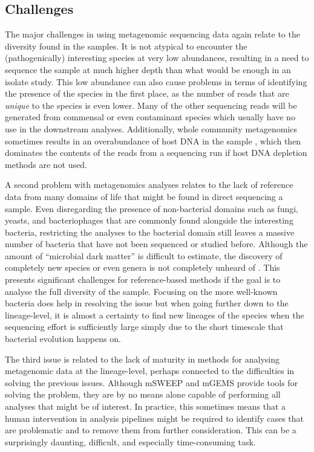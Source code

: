 \documentclass[officiallayout]{tktla}
\begin{document}
\subsection{Challenges}
The major challenges in using metagenomic sequencing data again relate
to the diversity found in the samples. It is not atypical to encounter
the (pathogenically) interesting species at very low abundances,
resulting in a need to sequence the sample at much higher depth than
what would be enough in an isolate study. This low abundance can also
cause problems in terms of identifying the presence of the species in
the first place, as the number of reads that are \textit{unique} to
the species is even lower. Many of the other sequencing reads will be
generated from commensal or even contaminant species which usually
have no use in the downstream analyses. Additionally, whole community metagenomics
sometimes results in an overabundance of host DNA in the sample
\citep{pereira2019impact, mcardle2020sensitivity}, which then
dominates the contents of the reads from a sequencing run if host DNA
depletion methods are not used.

A second problem with metagenomics analyses relates to the lack of
reference data from many domains of life that might be found in direct
sequencing a sample. Even disregarding the presence of non-bacterial
domains such as fungi, yeasts, and bacteriophages that are commonly
found alongside the interesting bacteria, restricting the analyses to
the bacterial domain still leaves a massive number of bacteria that
have not been sequenced or studied before. Although the amount of
``microbial dark matter'' \citep{rinke2013insights} is difficult to
estimate, the discovery of completely new species
\citep{thorpe2021one} or even genera is not completely unheard of
\citep{conle2020studies, pitt2019aquirufa}. This presents significant
challenges for reference-based methods if the goal is to analyse the
full diversity of the sample. Focusing on the more well-known bacteria
does help in resolving the issue but when going further down to the
lineage-level, it is almost a certainty to find new lineages of
the species when the sequencing effort is sufficiently large simply
due to the short timescale that bacterial evolution happens on.

The third issue is related to the lack of maturity in methods for
analysing metagenomic data at the lineage-level, perhaps connected to
the difficulties in solving the previous issues. Although mSWEEP and
mGEMS provide tools for solving the problem, they are by no means
alone capable of performing all analyses that might be of interest. In
practice, this sometimes means that a human intervention in analysis
pipelines might be required to identify cases that are problematic and
to remove them from further consideration. This can be a surprisingly
daunting, difficult, and especially time-consuming task.
\end{document}
